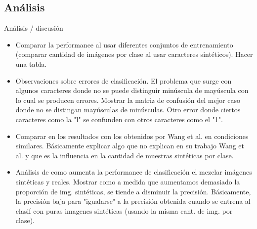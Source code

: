 \newpage
\subsection{Análisis}
	Análisis / discusión
	\begin{itemize}
		\item Comparar la performance al usar diferentes conjuntos de entrenamiento (comparar cantidad de imágenes por clase al usar caracteres sintéticos). Hacer una tabla.
		\item Observaciones sobre errores de clasificación. El problema que surge con algunos caracteres donde no se puede distinguir minúscula de mayúscula con lo cual se producen errores. Mostrar la matriz de confusión del mejor caso donde no se distingan mayúsculas de minúsculas. Otro error donde ciertos caracteres como la "l" se confunden con otros caracteres como el "1".
		\item Comparar en los resultados con los obtenidos por Wang et al. en condiciones similares. Básicamente explicar algo que no explican en su trabajo Wang et al. y que es la influencia en la cantidad de muestras sintéticas por clase.
		\item Análisis de como aumenta la performance de clasificación el mezclar imágenes sintéticas y reales. Mostrar como a medida que aumentamos demasiado la proporción de img. sintéticas, se tiende a disminuir la precisión. Básicamente, la precisión baja para "igualarse" a la precisión obtenida cuando se entrena al clasif con puras imagenes sintéticas (usando la misma cant. de img. por clase).
	\end{itemize}